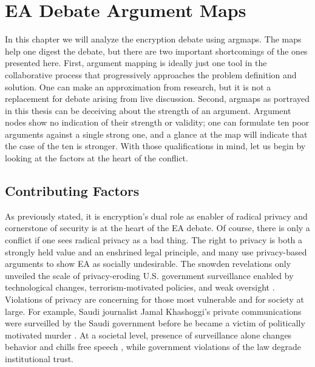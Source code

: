 \chapter{EA Debate Argument Maps}
\label{chap-arguments}

In this chapter we will analyze the \ac{encryption} debate using \acp{argmap}. The maps help one digest the debate, but
there are two important shortcomings of the ones presented here. First, argument mapping is ideally just one tool in the
collaborative process that progressively approaches the problem definition and solution. One can make an approximation
from research, but it is not a replacement for debate arising from live discussion. Second, \acp{argmap} as portrayed in
this thesis can be deceiving about the strength of an argument. Argument nodes show no indication of their strength or
validity; one can formulate ten poor arguments against a single strong one, and a glance at the map will indicate that
the case of the ten is stronger. With those qualifications in mind, let us begin by looking at the factors at the heart
of the conflict.

\section{Contributing Factors}

As previously stated, it is \ac{encryption}'s dual role as enabler of radical privacy and cornerstone of security is at
the heart of the EA debate. Of course, there is only a conflict if one sees radical privacy as a bad thing. The right to
privacy is both a strongly held value and an enshrined legal principle, and many use privacy-based arguments to show
\ac{EA} as socially undesirable. The \ac{snowden} revelations \cite{landau_making_2013} only unveiled the scale of
privacy-eroding U.S. government surveillance enabled by technological changes, terrorism-motivated policies, and weak
oversight \cite{shamsi_2011}. Violations of privacy are concerning for those most vulnerable and for society at large.
For example, Saudi journalist Jamal Khashoggi's private communications were surveilled by the Saudi government before he
became a victim of politically motivated murder \cite{liebermann_2019}. At a societal level, presence of surveillance
alone changes behavior and chills free speech \cite{rogaway_moral_2015}, while government violations of the law degrade
institutional trust.

